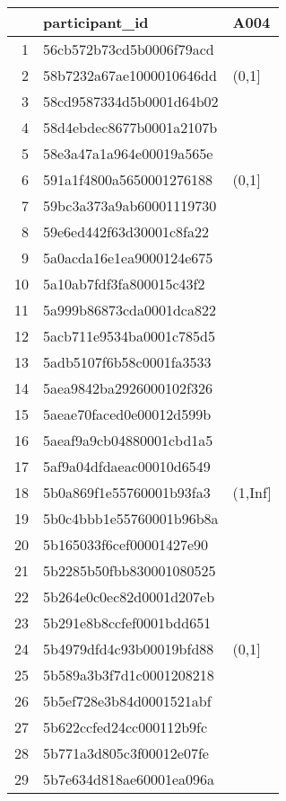 \begin{table}[ht]
\centering
\begin{tabular}{rll}
  \hline
 & participant\_id & A004 \\ 
  \hline
1 & 56cb572b73cd5b0006f79acd &  \\ 
  2 & 58b7232a67ae1000010646dd & (0,1] \\ 
  3 & 58cd9587334d5b0001d64b02 &  \\ 
  4 & 58d4ebdec8677b0001a2107b &  \\ 
  5 & 58e3a47a1a964e00019a565e &  \\ 
  6 & 591a1f4800a5650001276188 & (0,1] \\ 
  7 & 59bc3a373a9ab60001119730 &  \\ 
  8 & 59e6ed442f63d30001c8fa22 &  \\ 
  9 & 5a0acda16e1ea9000124e675 &  \\ 
  10 & 5a10ab7fdf3fa800015c43f2 &  \\ 
  11 & 5a999b86873cda0001dca822 &  \\ 
  12 & 5acb711e9534ba0001c785d5 &  \\ 
  13 & 5adb5107f6b58c0001fa3533 &  \\ 
  14 & 5aea9842ba2926000102f326 &  \\ 
  15 & 5aeae70faced0e00012d599b &  \\ 
  16 & 5aeaf9a9cb04880001cbd1a5 &  \\ 
  17 & 5af9a04dfdaeac00010d6549 &  \\ 
  18 & 5b0a869f1e55760001b93fa3 & (1,Inf] \\ 
  19 & 5b0c4bbb1e55760001b96b8a &  \\ 
  20 & 5b165033f6cef00001427e90 &  \\ 
  21 & 5b2285b50fbb830001080525 &  \\ 
  22 & 5b264e0c0ec82d0001d207eb &  \\ 
  23 & 5b291e8b8ccfef0001bdd651 &  \\ 
  24 & 5b4979dfd4c93b00019bfd88 & (0,1] \\ 
  25 & 5b589a3b3f7d1c0001208218 &  \\ 
  26 & 5b5ef728e3b84d0001521abf &  \\ 
  27 & 5b622ccfed24cc000112b9fc &  \\ 
  28 & 5b771a3d805c3f00012e07fe &  \\ 
  29 & 5b7e634d818ae60001ea096a &  \\ 

\end{tabular}
\end{table}
